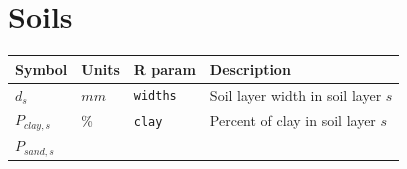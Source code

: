 \documentclass[]{book}
\begin{document}
\section{Soils}\label{soils}

\begin{longtable}[]{@{}llll@{}}
\toprule
\begin{minipage}[b]{0.11\columnwidth}\raggedright\strut
Symbol\strut
\end{minipage} & \begin{minipage}[b]{0.10\columnwidth}\raggedright\strut
Units\strut
\end{minipage} & \begin{minipage}[b]{0.12\columnwidth}\raggedright\strut
R param\strut
\end{minipage} & \begin{minipage}[b]{0.45\columnwidth}\raggedright\strut
Description\strut
\end{minipage}\tabularnewline
\midrule
\endhead
\begin{minipage}[t]{0.11\columnwidth}\raggedright\strut
\(d_{s}\)\strut
\end{minipage} & \begin{minipage}[t]{0.10\columnwidth}\raggedright\strut
\(mm\)\strut
\end{minipage} & \begin{minipage}[t]{0.12\columnwidth}\raggedright\strut
\texttt{widths}\strut
\end{minipage} & \begin{minipage}[t]{0.45\columnwidth}\raggedright\strut
Soil layer width in soil layer \(s\)\strut
\end{minipage}\tabularnewline
\begin{minipage}[t]{0.11\columnwidth}\raggedright\strut
\(P_{clay,s}\)\strut
\end{minipage} & \begin{minipage}[t]{0.10\columnwidth}\raggedright\strut
\%\strut
\end{minipage} & \begin{minipage}[t]{0.12\columnwidth}\raggedright\strut
\texttt{clay}\strut
\end{minipage} & \begin{minipage}[t]{0.45\columnwidth}\raggedright\strut
Percent of clay in soil layer \(s\)\strut
\end{minipage}\tabularnewline
\begin{minipage}[t]{0.11\columnwidth}\raggedright\strut
\(P_{sand,s}\)\strut
\end{minipage} & \begin{minipage}[t]{0.10\columnwidth}\raggedright\strut

\end{minipage}
\end{longtable}
\end{document}
